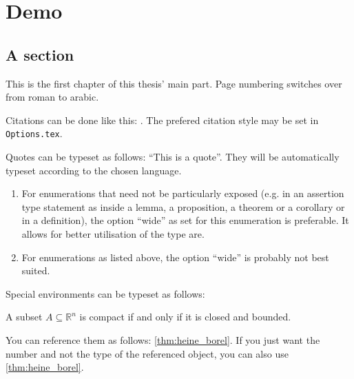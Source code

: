 \chapter{Demo}
\section{A section}

This is the first chapter of this thesis' main part. Page numbering switches over from roman to arabic. 

Citations can be done like this: \cite{Amann2008AnalysisII}. The prefered citation style may be set in \texttt{Options.tex}.

Quotes can be typeset as follows: \enquote{This is a quote}. They will be automatically typeset according to the chosen language.

\begin{enumerate}[wide]
	\item For enumerations that need not be particularly exposed (e.g. in an assertion type statement as inside a lemma, a proposition, a theorem or a corollary or in a definition), the option \enquote{wide} as set for
	this enumeration is preferable. It allows for better utilisation of the type are.
	\item For enumerations as listed above, the option \enquote{wide} is probably not best suited.
\end{enumerate}

Special environments can be typeset as follows:

\begin{Theorem}
\label{thm:heine_borel}
	A subset $A\subseteq \mathds{R}^n$ is compact if and only if it is closed and bounded. 
\end{Theorem}
You can reference them as follows: \cref{thm:heine_borel}. If you just want the number and not the type of the referenced object, you can also use \ref{thm:heine_borel}.